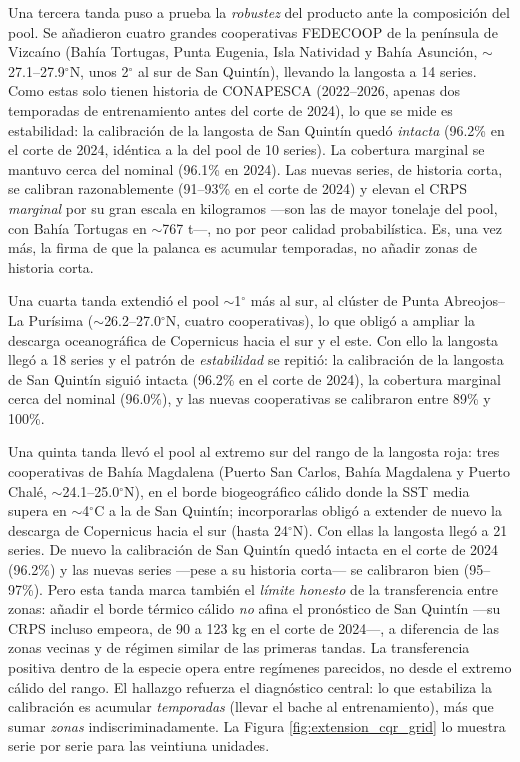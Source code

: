 Una tercera tanda puso a prueba la \emph{robustez} del producto ante la composición del pool. Se añadieron cuatro grandes cooperativas FEDECOOP de la península de Vizcaíno (Bahía Tortugas, Punta Eugenia, Isla Natividad y Bahía Asunción, $\sim$27.1--27.9$^\circ$N, unos 2$^\circ$ al sur de San Quintín), llevando la langosta a 14 series. Como estas solo tienen historia de CONAPESCA (2022--2026, apenas dos temporadas de entrenamiento antes del corte de 2024), lo que se mide es estabilidad: la calibración de la langosta de San Quintín quedó \emph{intacta} (96.2\% en el corte de 2024, idéntica a la del pool de 10 series). La cobertura marginal se mantuvo cerca del nominal (96.1\% en 2024). Las nuevas series, de historia corta, se calibran razonablemente (91--93\% en el corte de 2024) y elevan el CRPS \emph{marginal} por su gran escala en kilogramos ---son las de mayor tonelaje del pool, con Bahía Tortugas en $\sim$767 t---, no por peor calidad probabilística. Es, una vez más, la firma de que la palanca es acumular temporadas, no añadir zonas de historia corta.

Una cuarta tanda extendió el pool $\sim$1$^\circ$ más al sur, al clúster de Punta Abreojos--La Purísima ($\sim$26.2--27.0$^\circ$N, cuatro cooperativas), lo que obligó a ampliar la descarga oceanográfica de Copernicus hacia el sur y el este. Con ello la langosta llegó a 18 series y el patrón de \emph{estabilidad} se repitió: la calibración de la langosta de San Quintín siguió intacta (96.2\% en el corte de 2024), la cobertura marginal cerca del nominal (96.0\%), y las nuevas cooperativas se calibraron entre 89\% y 100\%.

Una quinta tanda llevó el pool al extremo sur del rango de la langosta roja: tres cooperativas de Bahía Magdalena (Puerto San Carlos, Bahía Magdalena y Puerto Chalé, $\sim$24.1--25.0$^\circ$N), en el borde biogeográfico cálido donde la SST media supera en $\sim$4$^\circ$C a la de San Quintín; incorporarlas obligó a extender de nuevo la descarga de Copernicus hacia el sur (hasta 24$^\circ$N). Con ellas la langosta llegó a 21 series. De nuevo la calibración de San Quintín quedó intacta en el corte de 2024 (96.2\%) y las nuevas series ---pese a su historia corta--- se calibraron bien (95--97\%). Pero esta tanda marca también el \emph{límite honesto} de la transferencia entre zonas: añadir el borde térmico cálido \emph{no} afina el pronóstico de San Quintín ---su CRPS incluso empeora, de 90 a 123 kg en el corte de 2024---, a diferencia de las zonas vecinas y de régimen similar de las primeras tandas. La transferencia positiva dentro de la especie opera entre regímenes parecidos, no desde el extremo cálido del rango. El hallazgo refuerza el diagnóstico central: lo que estabiliza la calibración es acumular \emph{temporadas} (llevar el bache al entrenamiento), más que sumar \emph{zonas} indiscriminadamente. La Figura \ref{fig:extension_cqr_grid} lo muestra serie por serie para las veintiuna unidades.

